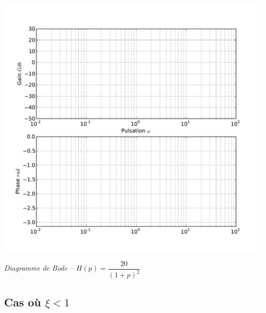 \documentclass[10pt,oneside]{article}
\begin{document}
\begin{center}
\includegraphics[width=.9\textwidth]{png/bode_vierge}

\textit{Diagramme de Bode -- $H(p)=\dfrac{20}{\left(1+ p \right)^2}$}
\end{center}



\subsection{Cas où $\xi<1$}
\end{document}
